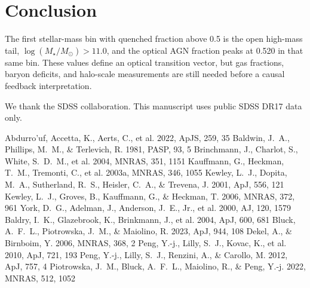 \documentclass[twocolumn]{aastex631}
\begin{document}
\section{Conclusion}\label{sec:conclusion}
The first stellar-mass bin with quenched fraction above 0.5 is the open high-mass tail, $\log(M_\star/M_\odot)>11.0$, and the optical AGN fraction peaks at 0.520 in that same bin. These values define an optical transition vector, but gas fractions, baryon deficits, and halo-scale measurements are still needed before a causal feedback interpretation.

\acknowledgments
We thank the SDSS collaboration. This manuscript uses public SDSS DR17 data only.


\begin{thebibliography}{}
 Abdurro'uf, Accetta, K., Aerts, C., et al. 2022, ApJS, 259, 35
 Baldwin, J.~A., Phillips, M.~M., \& Terlevich, R. 1981, PASP, 93, 5
 Brinchmann, J., Charlot, S., White, S.~D.~M., et al. 2004, MNRAS, 351, 1151
 Kauffmann, G., Heckman, T.~M., Tremonti, C., et al. 2003a, MNRAS, 346, 1055
 Kewley, L.~J., Dopita, M.~A., Sutherland, R.~S., Heisler, C.~A., \& Trevena, J. 2001, ApJ, 556, 121
 Kewley, L.~J., Groves, B., Kauffmann, G., \& Heckman, T. 2006, MNRAS, 372, 961
 York, D.~G., Adelman, J., Anderson, J.~E., Jr., et al. 2000, AJ, 120, 1579
 Baldry, I.~K., Glazebrook, K., Brinkmann, J., et al. 2004, ApJ, 600, 681
 Bluck, A.~F.~L., Piotrowska, J.~M., \& Maiolino, R. 2023, ApJ, 944, 108
 Dekel, A., \& Birnboim, Y. 2006, MNRAS, 368, 2
 Peng, Y.-j., Lilly, S.~J., Kovac, K., et al. 2010, ApJ, 721, 193
 Peng, Y.-j., Lilly, S.~J., Renzini, A., \& Carollo, M. 2012, ApJ, 757, 4
 Piotrowska, J.~M., Bluck, A.~F.~L., Maiolino, R., \& Peng, Y.-j. 2022, MNRAS, 512, 1052
\end{thebibliography}
\end{document}
